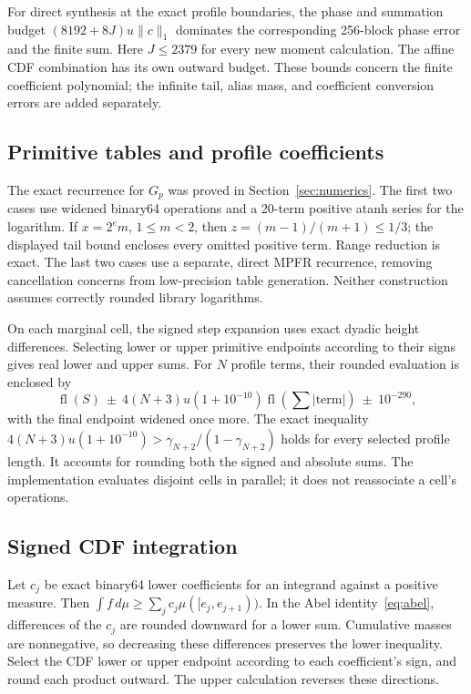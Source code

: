 \documentclass[11pt,a4paper]{article}
\theoremstyle{definition}\newtheorem{definition}[theorem]{Definition}
\theoremstyle{remark}\newtheorem{remark}[theorem]{Remark}
\numberwithin{equation}{section}
\begin{document}
For direct synthesis at the exact profile boundaries, the phase and summation budget $(8192+8J)u\|c\|_1$ dominates the corresponding 256-block phase error and the finite sum. Here $J\le2379$ for every new moment calculation. The affine CDF combination has its own outward budget. These bounds concern the finite coefficient polynomial; the infinite tail, alias mass, and coefficient conversion errors are added separately.

\subsection{Primitive tables and profile coefficients}
The exact recurrence for $G_p$ was proved in Section~\ref{sec:numerics}. The first two cases use widened binary64 operations and a 20-term positive atanh series for the logarithm. If $x=2^em$, $1\le m<2$, then $z=(m-1)/(m+1)\le1/3$; the displayed tail bound encloses every omitted positive term. Range reduction is exact. The last two cases use a separate, direct MPFR recurrence, removing cancellation concerns from low-precision table generation. Neither construction assumes correctly rounded library logarithms.

On each marginal cell, the signed step expansion uses exact dyadic height differences. Selecting lower or upper primitive endpoints according to their signs gives real lower and upper sums. For $N$ profile terms, their rounded evaluation is enclosed by
\[
 \operatorname{fl}(S)\ \pm\ 4(N+3)u(1+10^{-10})
       \operatorname{fl}\left(\sum|\text{term}|\right)
       \ \pm\ 10^{-290},
\]
with the final endpoint widened once more. The exact inequality
$4(N+3)u(1+10^{-10})>\gamma_{N+2}/(1-\gamma_{N+2})$
holds for every selected profile length. It accounts for rounding both the signed and absolute sums. The implementation evaluates disjoint cells in parallel; it does not reassociate a cell's operations.

\subsection{Signed CDF integration}
Let $c_j$ be exact binary64 lower coefficients for an integrand against a positive measure. Then $\int f\,d\mu\ge\sum_jc_j\mu([e_j,e_{j+1}))$. In the Abel identity~\eqref{eq:abel}, differences of the $c_j$ are rounded downward for a lower sum. Cumulative masses are nonnegative, so decreasing these differences preserves the lower inequality. Select the CDF lower or upper endpoint according to each coefficient's sign, and round each product outward. The upper calculation reverses these directions.
\end{document}
